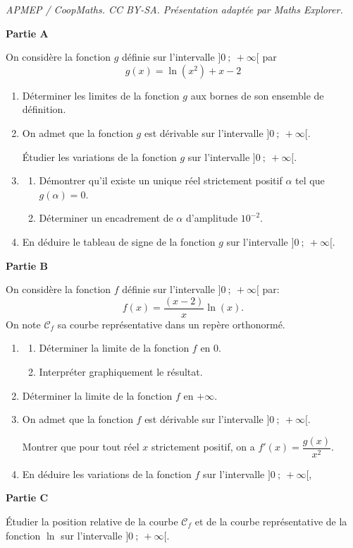 \documentclass[10pt]{article}
\begin{document}
\noindent\textit{APMEP / CoopMaths. CC BY-SA. Présentation adaptée par Maths Explorer.}\par\medskip
\medskip

\textbf{Partie A}

\medskip

On considère la fonction $g$ définie sur l'intervalle $]0~;~+\infty[$ par
\[g(x) = \ln \left(x^2\right) + x - 2\]
\begin{enumerate}
\item  Déterminer les limites de la fonction $g$ aux bornes de son ensemble de définition.
\item  On admet que la fonction $g$ est dérivable sur l'intervalle $]0~;~+\infty[$.

Étudier les variations de la fonction $g$ sur l'intervalle $]0~;~+\infty[$.
\item \begin{enumerate}
\item  Démontrer qu'il existe un unique réel strictement positif $\alpha$  tel que $g(\alpha) = 0$.
\item Déterminer un encadrement de $\alpha$ d'amplitude $10^{-2}$.
\end{enumerate}
\item En déduire le tableau de signe de la fonction $g$ sur l'intervalle $]0~;~+\infty[$.
\end{enumerate}

\medskip

\textbf{Partie B}

\medskip

On considère la fonction $f$ définie sur l'intervalle $]0~;~+\infty[$ par:
\[f(x) = \dfrac{(x-2)}{x}\ln(x).\]
On note $\mathcal{C}_f$ sa courbe représentative dans un repère orthonormé.
\begin{enumerate}
\item \begin{enumerate}
\item Déterminer la limite de la fonction $f$ en 0.
\item Interpréter graphiquement le résultat.
\end{enumerate}
\item Déterminer la limite de la fonction $f$ en $+\infty$.
\item On admet que la fonction $f$ est dérivable sur l'intervalle $]0~;~+\infty[$.

Montrer que pour tout réel $x$ strictement positif, on a $f'(x)=\dfrac{g(x)}{x^2}$.

\item En déduire les variations de la fonction $f$ sur l'intervalle $]0~;~+\infty[$,
\end{enumerate}
\medskip
\textbf{Partie C}
\medskip

Étudier la position relative de la courbe $\mathcal{C}_f$ et de la courbe représentative de la fonction $\ln$ sur l'intervalle $]0~;~+\infty[$.

\bigskip
\end{document}
